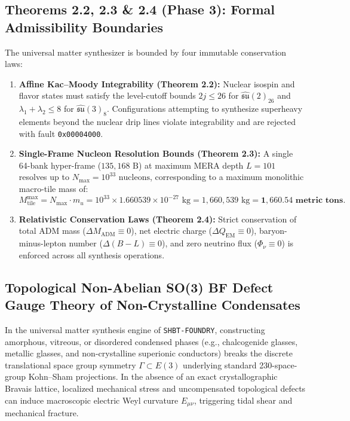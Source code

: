 \documentclass[11pt,onecolumn]{article}
\begin{document}
\FloatBarrier
\subsection{Theorems 2.2, 2.3 \& 2.4 (Phase 3): Formal Admissibility Boundaries}
The universal matter synthesizer is bounded by four immutable conservation laws:
\begin{enumerate}
    \item \textbf{Affine Kac--Moody Integrability (Theorem 2.2):} Nuclear isospin and flavor states must satisfy the level-cutoff bounds $2j \le 26$ for $\hat{\mathfrak{su}}(2)_{26}$ and $\lambda_1 + \lambda_2 \le 8$ for $\hat{\mathfrak{su}}(3)_8$. Configurations attempting to synthesize superheavy elements beyond the nuclear drip lines violate integrability and are rejected with fault \texttt{0x00004000}.
    \item \textbf{Single-Frame Nucleon Resolution Bounds (Theorem 2.3):} A single 64-bank hyper-frame ($135{,}168\text{ B}$) at maximum MERA depth $L = 101$ resolves up to $N_{\max} = 10^{33}\text{ nucleons}$, corresponding to a maximum monolithic macro-tile mass of:
    \begin{equation}
    M_{\text{tile}}^{\max} = N_{\max} \cdot m_u = 10^{33} \times 1.660539 \times 10^{-27}\text{ kg} = 1{,}660{,}539\text{ kg} = \mathbf{1{,}660.54\text{ metric tons}}.
    \label{eq:macro_tile_mass}
    \end{equation}
    \item \textbf{Relativistic Conservation Laws (Theorem 2.4):} Strict conservation of total ADM mass ($\Delta M_{\text{ADM}} \equiv 0$), net electric charge ($\Delta Q_{\text{EM}} \equiv 0$), baryon-minus-lepton number ($\Delta(B-L) \equiv 0$), and zero neutrino flux ($\Phi_\nu \equiv 0$) is enforced across all synthesis operations.
\end{enumerate}

\FloatBarrier
\subsection{Topological Non-Abelian SO(3) BF Defect Gauge Theory of Non-Crystalline Condensates}
\label{sec:amorphous_bf_defect_gauge}

In the universal matter synthesis engine of \texttt{SHBT-FOUNDRY}, constructing amorphous, vitreous, or disordered condensed phases (e.g., chalcogenide glasses, metallic glasses, and non-crystalline superionic conductors) breaks the discrete translational space group symmetry $\Gamma \subset E(3)$ underlying standard 230-space-group Kohn--Sham projections. In the absence of an exact crystallographic Bravais lattice, localized mechanical stress and uncompensated topological defects can induce macroscopic electric Weyl curvature $E_{\mu\nu}$, triggering tidal shear and mechanical fracture.
\end{document}
